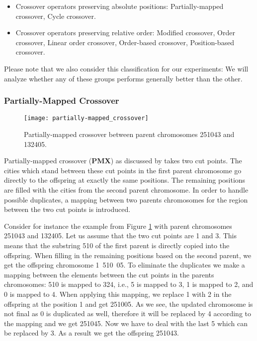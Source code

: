 \begin{itemize}
	\item Crossover operators preserving absolute positions:
		\subitem Partially-mapped crossover, 
		\subitem Cycle crossover. 
	\item Crossover operators preserving relative order:
		\subitem Modified crossover,
		\subitem Order crossover,
		\subitem Linear order crossover,	
		\subitem Order-based crossover,  
		\subitem Position-based crossover.
\end{itemize}

Please note that we also consider this classification for our experiments: We will analyze whether any of these groups performs generally better than the other.

\subsubsection{Partially-Mapped Crossover }
\label{subsubsec:pmx}

\begin{figure}[htp] \centering
	\centering
	\texttt{[image: partially-mapped\_crossover]}
	\caption{Partially-mapped crossover between parent chromosomes 251043 and 132405.}
	\label{partially-mapped_crossover}
\end{figure}

Partially-mapped crossover (\textbf{PMX}) as discussed by \citeauthor{potvin1996genetic} \cite{potvin1996genetic} takes two cut points. The cities which stand between these cut points in the first parent chromosome go directly to the offspring at exactly the same positions. The remaining positions are filled with the cities from the second parent chromosome. In order to handle possible duplicates, a mapping between two parents chromosomes for the region between the two cut points is introduced. \par

Consider for instance the example from Figure \ref{partially-mapped_crossover} with parent chromosomes 251043 and 132405. Let us assume that the two cut points are 1 and 3. This means that the substring 510 of the first parent is directly copied into the offspring. When filling in the remaining positions based on the second parent, we get the offspring chromosome \mbox{1 510 05}. To eliminate the duplicates we make a mapping between the elements between the cut points in the parents chromosomes: 510 is mapped to 324, i.e., 5 is mapped to 3, 1 is mapped to 2, and 0 is mapped to 4.  When applying this mapping, we replace 1 with 2 in the offspring at the position 1 and get 251005. As we see, the updated chromosome is not final as 0 is duplicated as well, therefore it will be replaced by 4 according to the mapping and we get 251045. Now we have to deal with the last 5 which can be replaced by 3. As a result we get the offspring 251043. \par

